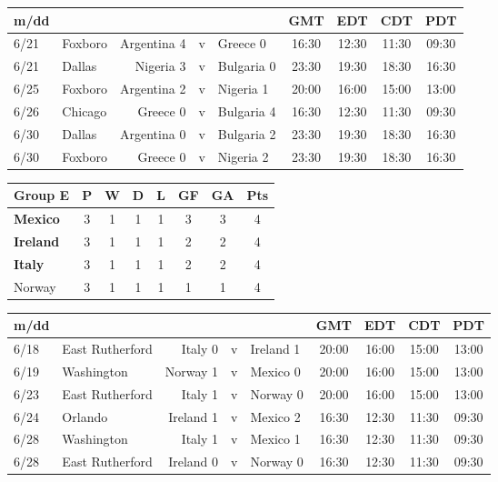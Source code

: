 \begin{figure}[H]

\begin{tabular}{l l r c l c c c c}
m/dd  & & & & & GMT & EDT & CDT & PDT \\ \hline
6/21 & Foxboro & Argentina 4 & v & Greece 0 & 16:30 & 12:30 & 11:30 & 09:30 \\
6/21 & Dallas & Nigeria 3 & v & Bulgaria 0 & 23:30 & 19:30 & 18:30 & 16:30 \\
6/25 & Foxboro & Argentina 2 & v & Nigeria 1 & 20:00 &16:00 & 15:00 & 13:00 \\
6/26 & Chicago & Greece 0 & v & Bulgaria 4 & 16:30 & 12:30 & 11:30 & 09:30 \\
6/30 & Dallas & Argentina 0 &  v & Bulgaria 2 & 23:30 & 19:30 & 18:30 & 16:30 \\
6/30 & Foxboro & Greece 0 & v & Nigeria 2 & 23:30 & 19:30 & 18:30 & 16:30 \\ \hline
\end{tabular}
\end{figure}
\begin{figure}[H]

\begin{tabular}{l*{7}{c}}
Group E & P & W & D & L & GF & GA & Pts \\ \hline
\textbf{Mexico} & 3 & 1 & 1 & 1 & 3 & 3 & 4 \\
\textbf{Ireland} & 3 & 1 & 1 & 1 & 2 & 2 & 4 \\
\textbf{Italy} & 3 & 1 & 1 & 1 & 2 & 2 & 4 \\
Norway & 3 & 1 & 1 & 1 & 1 & 1 & 4 \\ \hline
\end{tabular}
\end{figure}
\begin{figure}[H]

\begin{tabular}{l l r c l c c c c}
m/dd  & & & & & GMT & EDT & CDT & PDT \\ \hline
6/18 & East Rutherford & Italy 0 & v & Ireland 1 & 20:00 &16:00 & 15:00 & 13:00 \\
6/19 & Washington & Norway 1 & v & Mexico 0 & 20:00 &16:00 & 15:00 & 13:00 \\
6/23 & East Rutherford & Italy 1 & v & Norway 0 & 20:00 &16:00 & 15:00 & 13:00 \\
6/24 & Orlando & Ireland 1 & v & Mexico 2 & 16:30 & 12:30 & 11:30 & 09:30 \\
6/28 & Washington & Italy 1 & v & Mexico 1 & 16:30 & 12:30 & 11:30 & 09:30 \\
6/28 & East Rutherford & Ireland 0 & v & Norway 0 & 16:30 & 12:30 & 11:30 & 09:30 \\ \hline
\end{tabular}
\end{figure}
